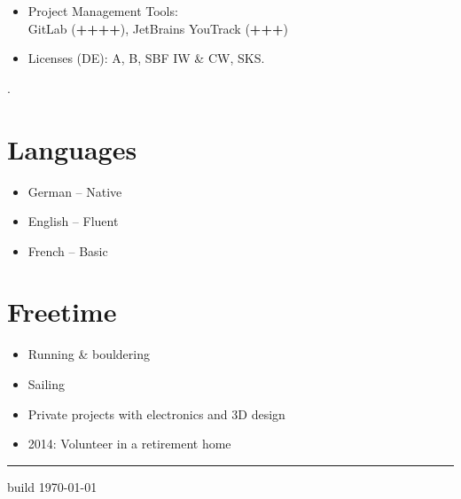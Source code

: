 \documentclass[a4paper,11pt]{article}
\newcommand{\col}[2]{\textcolor[HTML]{#1}{#2}}
\begin{document}
\begin{minipage}[t]{0.65\textwidth}
\begin{minipage}[t]{0.625\textwidth}
\begin{itemize}
            \item Project Management Tools:\\
            GitLab (\textbf{++++}), JetBrains YouTrack (\textbf{+++})

            \item Licenses (DE): A, B, SBF IW \& CW, SKS.
        \end{itemize}
    \end{minipage}
    \hfill
    \begin{minipage}[t]{0.325\textwidth}
        \col{ffffff}{.} %
        \section*{\col{6c84ac}{Languages}}
        \begin{flushleft}
            \begin{itemize}
                \small
                \item German -- Native
                \item English -- Fluent
                \item French -- Basic
            \end{itemize}

            \section*{\col{587aab}{Freetime}}
            \begin{itemize}
                \small
                \item Running \& bouldering
                \item Sailing
                \item Private projects with electronics and 3D design
                \item 2014: Volunteer in a retirement home
            \end{itemize}
        \end{flushleft}
    \end{minipage}

\end{minipage}

\vfill
\hfill
\vspace{0.17cm}
\begin{minipage}[t]{0.65\textwidth}
    \hrule
    \vspace{0.125cm}

    \small build \href{\giturl}{\texttt{\gitcommit}} \hfill \today
\end{minipage}
\end{document}

